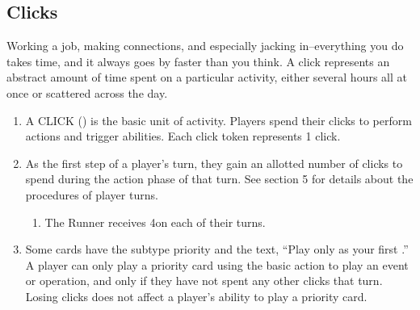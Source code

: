 \subsection{Clicks}
Working a job, making connections, and especially jacking in--everything you do takes time, and it always goes by faster than you think. A click represents an abstract amount of time spent on a
particular activity, either several hours all at once or scattered across the day.
\begin{enumerate}
	\item A CLICK (\click) is the basic unit of activity. Players spend their clicks to perform actions and trigger abilities. Each click token represents 1 click.
	\item As the first step of a player's turn, they gain an allotted number of clicks to spend during the action phase of that turn. See section 5 for details about the procedures of player turns.
	      \begin{enumerate}
		      \item The Runner receives 4\click on each of their turns.
	      \end{enumerate}
	\item Some cards have the subtype priority and the text, ``Play only as your first \click.'' A player can only play a priority card using the basic action to play an event or operation, and only if they have not spent any other clicks that turn. Losing clicks does not affect a player's ability to play a priority card.
\end{enumerate}